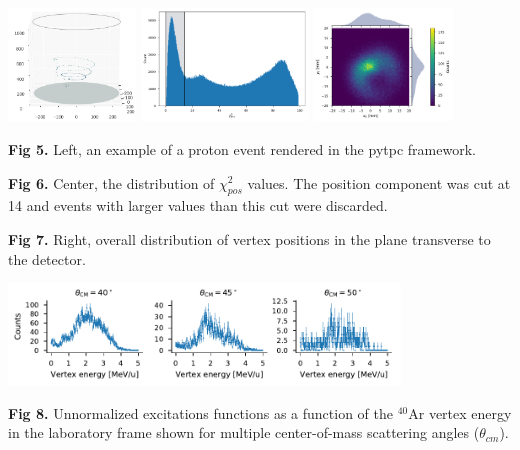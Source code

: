 \documentclass[ansiepaper,portrait]{baposter}
\begin{document}
\begin{poster}
{\begin{center}
\includegraphics[height=30mm]{chamber_plot.png}
\hspace{.75cm}
\includegraphics [height=30mm] {chi2pos.pdf}
\hspace{.75cm}
\includegraphics [height=30mm] {vertex_pos_distrib.pdf}
\end{center}

\small{\textbf{Fig 5.} Left, an example of a proton event rendered in the pytpc framework.}

\small{\textbf{Fig 6.} Center, the distribution of $\chi_{pos}^{2}$ values. The position component was cut at 14 and events with larger values than this cut were discarded.}

\small{\textbf{Fig 7.} Right, overall distribution of vertex positions in the plane transverse to the detector.}

\begin{center}
\includegraphics [width=104mm] {angular_excitation_hists_POSTER.pdf}
\end{center}
\small{\textbf{Fig 8.} Unnormalized excitations functions as a function of the $^{40}$Ar vertex energy in the laboratory frame shown for multiple center-of-mass scattering angles ($\theta_{cm}$).}
}


\end{poster}
\end{document}

